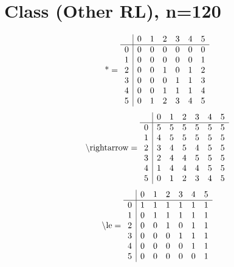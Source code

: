 \documentclass[11pt]{article}
\begin{document}
\section{Class (Other RL), n=120}
\[\text{*} = 
\begin{array}{r | r r r r r r}
 & 0 & 1 & 2 & 3 & 4 & 5 \\ \hline
0 & 0 & 0 & 0 & 0 & 0 & 0 \\
1 & 0 & 0 & 0 & 0 & 0 & 1 \\
2 & 0 & 0 & 1 & 0 & 1 & 2 \\
3 & 0 & 0 & 0 & 1 & 1 & 3 \\
4 & 0 & 0 & 1 & 1 & 1 & 4 \\
5 & 0 & 1 & 2 & 3 & 4 & 5 \\
\end{array}
\]
\[\text{\textbackslash rightarrow} = 
\begin{array}{r | r r r r r r}
 & 0 & 1 & 2 & 3 & 4 & 5 \\ \hline
0 & 5 & 5 & 5 & 5 & 5 & 5 \\
1 & 4 & 5 & 5 & 5 & 5 & 5 \\
2 & 3 & 4 & 5 & 4 & 5 & 5 \\
3 & 2 & 4 & 4 & 5 & 5 & 5 \\
4 & 1 & 4 & 4 & 4 & 5 & 5 \\
5 & 0 & 1 & 2 & 3 & 4 & 5 \\
\end{array}
\]
\[\text{\textbackslash le} = 
\begin{array}{r | r r r r r r}
 & 0 & 1 & 2 & 3 & 4 & 5 \\ \hline
0 & 1 & 1 & 1 & 1 & 1 & 1 \\
1 & 0 & 1 & 1 & 1 & 1 & 1 \\
2 & 0 & 0 & 1 & 0 & 1 & 1 \\
3 & 0 & 0 & 0 & 1 & 1 & 1 \\
4 & 0 & 0 & 0 & 0 & 1 & 1 \\
5 & 0 & 0 & 0 & 0 & 0 & 1 \\
\end{array}
\]
\end{document}
